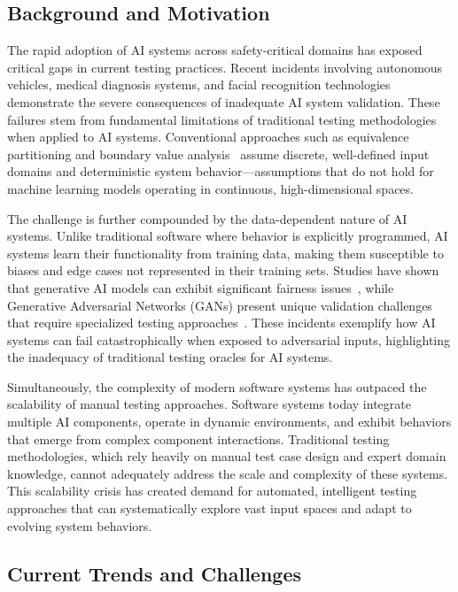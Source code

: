 \documentclass[manuscript,screen,review]{acmart}
\begin{document}
\subsection{Background and Motivation}

The rapid adoption of AI systems across safety-critical domains has exposed critical gaps in current testing practices. Recent incidents involving autonomous vehicles, medical diagnosis systems, and facial recognition technologies demonstrate the severe consequences of inadequate AI system validation. These failures stem from fundamental limitations of traditional testing methodologies when applied to AI systems. Conventional approaches such as equivalence partitioning and boundary value analysis~\cite{Guo2024} assume discrete, well-defined input domains and deterministic system behavior—assumptions that do not hold for machine learning models operating in continuous, high-dimensional spaces.

The challenge is further compounded by the data-dependent nature of AI systems. Unlike traditional software where behavior is explicitly programmed, AI systems learn their functionality from training data, making them susceptible to biases and edge cases not represented in their training sets. Studies have shown that generative AI models can exhibit significant fairness issues~\cite{Zhou2024}, while Generative Adversarial Networks (GANs) present unique validation challenges that require specialized testing approaches~\cite{Kenfack2021}. These incidents exemplify how AI systems can fail catastrophically when exposed to adversarial inputs, highlighting the inadequacy of traditional testing oracles for AI systems.

Simultaneously, the complexity of modern software systems has outpaced the scalability of manual testing approaches. Software systems today integrate multiple AI components, operate in dynamic environments, and exhibit behaviors that emerge from complex component interactions. Traditional testing methodologies, which rely heavily on manual test case design and expert domain knowledge, cannot adequately address the scale and complexity of these systems. This scalability crisis has created demand for automated, intelligent testing approaches that can systematically explore vast input spaces and adapt to evolving system behaviors.

\subsection{Current Trends and Challenges}
\end{document}
